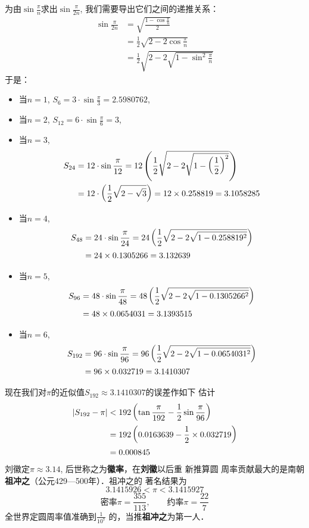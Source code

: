 为由$\sin\frac{\pi}{n}$求出$\sin\frac{\pi}{2n}$, 我们需要导出它们之间的递推关系：
\[\begin{split}
    \sin\frac{\pi}{2n}&=\sqrt{\frac{1-\cos\frac{\pi}{n}}{2}}\\
    &=\frac{1}{2}\sqrt{2-2\cos\frac{\pi}{n}}\\
    &=\frac{1}{2}\sqrt{2-2\sqrt{1-\sin^2\frac{\pi}{n}}}
\end{split}\]
于是：
\begin{itemize}
    \item 当$n=1$, $S_6=3\cdot \sin \frac{\pi}{3}=2.5980762$, 
    \item 当$n=2$, $S_{12}=6\cdot \sin \frac{\pi}{6}=3$,
    \item 当$n=3$, 
    \[\begin{split}
        S_{24}&=12\cdot \sin \dfrac{\pi}{12}=12\left(\dfrac{1}{2}\sqrt{2-2\sqrt{1-\left(\dfrac{1}{2}\right)^2}}\right)\\
        &=12\cdot \left(\dfrac{1}{2}\sqrt{2-\sqrt{3}}\right)=12\times 0.258819=3.1058285
    \end{split}\]
    \item 当$n=4$, 
    \[\begin{split}
        S_{48}&=24\cdot \sin \dfrac{\pi}{24}=24\left(\dfrac{1}{2}\sqrt{2-2\sqrt{1-0.258819^2}}\right)\\
        &=24\times 0.1305266=3.132639
    \end{split}\]
    \item 当$n=5$, 
    \[\begin{split}
        S_{96}&=48\cdot \sin \dfrac{\pi}{48}=48\left(\dfrac{1}{2}\sqrt{2-2\sqrt{1-0.1305266^2}}\right)\\
        &=48\times 0.0654031=3.1393515
    \end{split}\]
    \item 当$n=6$, 
    \[\begin{split}
        S_{192}&=96\cdot \sin \dfrac{\pi}{96}=96\left(\dfrac{1}{2}\sqrt{2-2\sqrt{1-0.0654031^2}}\right)\\
        &=96\times 0.032719=3.1410307
    \end{split}\]
\end{itemize}

现在我们对$\pi$的近似值$S_{192}\approx 3.1410307$的误差作如下
估计
\[\begin{split}
    |S_{192}-\pi|&<192\left(\tan\dfrac{\pi}{192}-\dfrac{1}{2}\sin\dfrac{\pi}{96}\right)\\
    &=192\left(0.0163639-\dfrac{1}{2}\times 0.032719\right)\\
    &=0.000845
\end{split}\]
刘徽定$\pi\approx 3.14$, 后世称之为\textbf{徽率}，在\textbf{刘徽}以后重 新推算圆
周率贡献最大的是南朝\textbf{祖冲之}（公元429—500年）．祖冲之的
著名结果为
\[3.1415926<\pi <3.1415927\]
\[\text{密率}\pi=\frac{355}{113},\qquad \text{约率}\pi=\frac{22}{7}\]
全世界定圆周率值准确到$\frac{1}{10^7}$
的，当推\textbf{祖冲之}为第一人．


